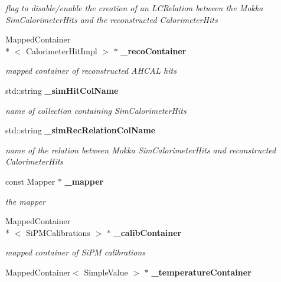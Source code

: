 \begin{DoxyCompactItemize}
\begin{DoxyCompactList}\small\item\em flag to disable/enable the creation of an L\-C\-Relation between the Mokka Sim\-Calorimeter\-Hits and the reconstructed Calorimeter\-Hits \end{DoxyCompactList}\item 
Mapped\-Container\\*
$<$ Calorimeter\-Hit\-Impl $>$ $\ast$ {\bf \-\_\-reco\-Container}\label{classCALICE_1_1SiPMCalibrateProcessor_ad95f8f4f5a8053e41cd19f10869f6308}

\begin{DoxyCompactList}\small\item\em mapped container of reconstructed A\-H\-C\-A\-L hits \end{DoxyCompactList}\item 
std\-::string {\bf \-\_\-sim\-Hit\-Col\-Name}\label{classCALICE_1_1SiPMCalibrateProcessor_ace988b5155d638e3a813a7b2a72bbe96}

\begin{DoxyCompactList}\small\item\em name of collection containing Sim\-Calorimeter\-Hits \end{DoxyCompactList}\item 
std\-::string {\bf \-\_\-sim\-Rec\-Relation\-Col\-Name}\label{classCALICE_1_1SiPMCalibrateProcessor_a919e77aed15f7167dbdc8636341b26ad}

\begin{DoxyCompactList}\small\item\em name of the relation between Mokka Sim\-Calorimeter\-Hits and reconstructed Calorimeter\-Hits \end{DoxyCompactList}\item 
const Mapper $\ast$ {\bf \-\_\-mapper}\label{classCALICE_1_1SiPMCalibrateProcessor_a02bb58794a7bfaade36b8ea48174a4b1}

\begin{DoxyCompactList}\small\item\em the mapper \end{DoxyCompactList}\item 
Mapped\-Container\\*
$<$ Si\-P\-M\-Calibrations $>$ $\ast$ {\bf \-\_\-calib\-Container}\label{classCALICE_1_1SiPMCalibrateProcessor_a40e1e74a8da4c3033f4781f466c447fd}

\begin{DoxyCompactList}\small\item\em mapped container of Si\-P\-M calibrations \end{DoxyCompactList}\item 
Mapped\-Container$<$ Simple\-Value $>$ $\ast$ {\bf \-\_\-temperature\-Container}\label{classCALICE_1_1SiPMCalibrateProcessor_a1b48a88d42d7f14a0f70b820765b5ade}


\end{DoxyCompactItemize}
